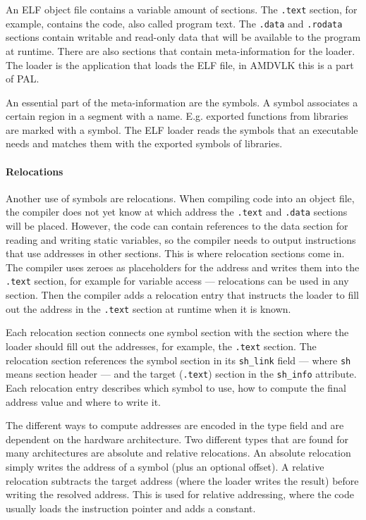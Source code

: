 An ELF object file contains a variable amount of sections. The \texttt{.text} section, for example, contains the code, also called program text.
The \texttt{.data} and \texttt{.rodata} sections contain writable and read-only data that will be available to the program at runtime.
There are also sections that contain meta-information for the loader.
The loader is the application that loads the ELF file, in AMDVLK this is a part of PAL.

An essential part of the meta-information are the symbols. A symbol associates a certain region in a segment with a name. E.g. exported functions from libraries are marked with a symbol. The ELF loader reads the symbols that an executable needs and matches them with the exported symbols of libraries.

\paragraph{Relocations} Another use of symbols are relocations. When compiling code into an object file, the compiler does not yet know at which address the \texttt{.text} and \texttt{.data} sections will be placed. However, the code can contain references to the data section for reading and writing static variables, so the compiler needs to output instructions that use addresses in other sections. This is where relocation sections come in. The compiler uses zeroes as  placeholders for the address and writes them into the \texttt{.text} section, for example for variable access --- relocations can be used in any section. Then the compiler adds a relocation entry that instructs the loader to fill out the address in the \texttt{.text} section at runtime when it is known.

Each relocation section connects one symbol section with the section where the loader should fill out the addresses, for example, the \texttt{.text} section. The relocation section references the symbol section in its \texttt{sh\_link} field --- where \texttt{sh} means section header --- and the target (\texttt{.text}) section in the \texttt{sh\_info} attribute. Each relocation entry describes which symbol to use, how to compute the final address value and where to write it.

The different ways to compute addresses are encoded in the type field and are dependent on the hardware architecture. Two different types that are found for many architectures are absolute and relative relocations. An absolute relocation simply writes the address of a symbol (plus an optional offset). A relative relocation subtracts the target address (where the loader writes the result) before writing the resolved address. This is used for relative addressing, where the code usually loads the instruction pointer and adds a constant.~\cite{BenderskyRelocations}

